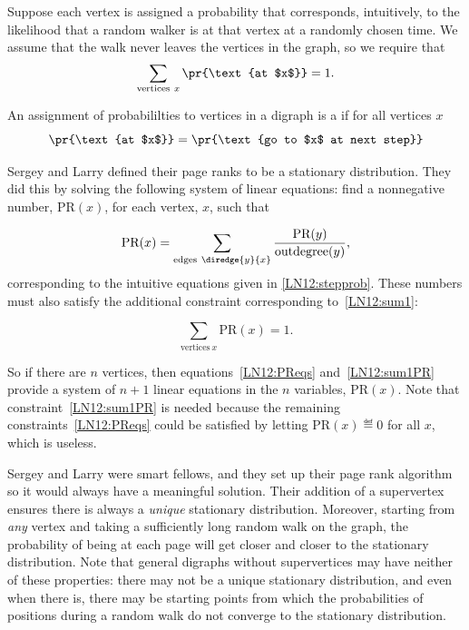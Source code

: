 Suppose each vertex is assigned a probability that corresponds, intuitively,
to the likelihood that a random walker is at that vertex at a randomly
chosen time.  We assume that the walk never leaves the vertices in the graph,
so we require that
\begin{equation}\label{LN12:sum1}
\sum_{\text{vertices}\ x} \pr{\text{at $x$}} = 1.
\end{equation}

\begin{definition} An assignment of probabililties to vertices in a digraph
  is a  if for all vertices $x$
\[
\pr{\text{at $x$}} = \pr{\text{go to $x$ at next step}}
\]
\end{definition}  

Sergey and Larry defined their page ranks to be a stationary distribution.
They did this by solving the following system of linear equations: find a
nonnegative number, $\text{PR}(x)$, for each vertex, $x$, such that

\begin{equation}\label{LN12:PReqs}
\text{PR}(x) = \sum_{\text{edges}\ \diredge{y}{x}} \frac{\text{PR}(y)}{\text{outdegree}(y)},
\end{equation}
corresponding to the intuitive equations given in \eqref{LN12:stepprob}.
These numbers must also satisfy the additional constraint corresponding
to~\eqref{LN12:sum1}:

\begin{equation}\label{LN12:sum1PR}
\sum_{\text{vertices}\ x} \text{PR}(x) = 1.
\end{equation}

So if there are $n$ vertices, then equations~\eqref{LN12:PReqs}
and~\eqref{LN12:sum1PR} provide a system of $n+1$ linear equations in the
$n$ variables, $\text{PR}(x)$.  Note that constraint~\eqref{LN12:sum1PR}
is needed because the remaining constraints~\eqref{LN12:PReqs} could be
satisfied by letting $\text{PR}(x)\eqdef 0$ for all $x$, which is useless.

Sergey and Larry were smart fellows, and they set up their page rank
algorithm so it would always have a meaningful solution.  Their addition
of a supervertex ensures there is always a \emph{unique} stationary
distribution.  Moreover, starting from \emph{any} vertex and taking a
sufficiently long random walk on the graph, the probability of being at
each page will get closer and closer to the stationary distribution.  Note
that general digraphs without supervertices may have neither of these
properties: there may not be a unique stationary distribution, and even
when there is, there may be starting points from which the probabilities
of positions during a random walk do not converge to the stationary
distribution.  

